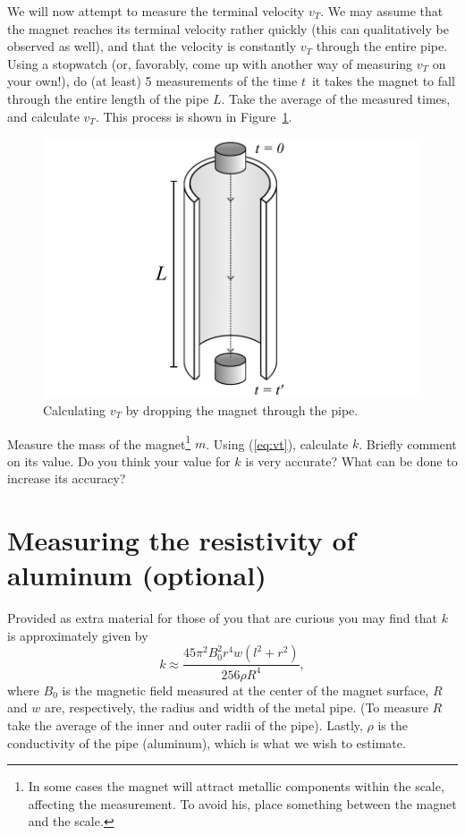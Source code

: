 \documentclass[%
oneside,                 %
final,                   %
10pt]{article}
\begin{document}
We will now attempt to measure the terminal velocity $v_T$. We may assume that the magnet reaches its terminal velocity rather quickly (this can qualitatively be observed as well), and that the velocity is constantly $v_T$ through the entire pipe.
Using a stopwatch (or, favorably, come up with another way of measuring $v_T$ on your own!), do (at least) 5 measurements of the time $t$ it takes the magnet to fall through the entire length of the pipe $L$. Take the average of the measured times, and calculate $v_T$.
This process is shown in Figure~\ref{fig:cylindermagnets}.


\begin{figure}[!ht]  %
  \centerline{\includegraphics[width=0.9\linewidth]{figures/cylindermagnets.png}}
  \caption{
  Calculating $v_T$ by dropping the magnet through the pipe. \label{fig:cylindermagnets}
  }
\end{figure}


Measure the mass of the magnet\footnote{In some cases the magnet will attract metallic components within the scale, affecting the measurement. To avoid his, place something between the magnet and the scale.} $m$. Using (\ref{eq:vt}), calculate $k$. Briefly comment on its value.
Do you think your value for $k$ is very accurate? What can be done to increase its accuracy?  

\section{Measuring the resistivity of aluminum (optional)}

Provided as extra material for those of you that are curious you may find that $k$ is approximately given by
$$
k \approx \frac{45\pi^2 B_0^{2} r^{4} w\left(l^{2}+r^{2}\right)}{256 \rho R^{4}},
$$
where $B_0$ is the magnetic field measured at the center of the magnet surface, $R$ and $w$ are, respectively, the radius and width of the metal pipe. (To measure $R$ take the average of the inner and outer radii of the pipe).
Lastly, $\rho$ is the conductivity of the pipe (aluminum), which is what we wish to estimate.
\end{document}
